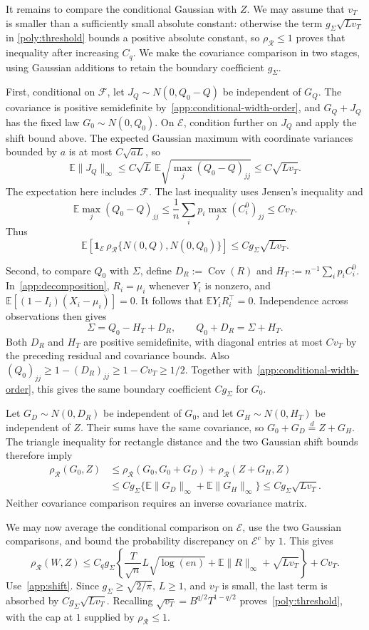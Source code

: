 \documentclass[11pt,letterpaper]{article}
\theoremstyle{remark}
\newcommand{\E}{\mathbb E}
\newcommand{\Cov}{\operatorname{Cov}}
\newcommand{\rh}{\rho_{\mathcal R}}
\newcommand{\ind}{\mathbf 1}
\begin{document}
It remains to compare the conditional Gaussian with $Z$. We may
assume that $v_T$ is smaller than a sufficiently small absolute
constant: otherwise the term $g_\Sigma\sqrt{Lv_T}$ in
\eqref{poly:threshold} bounds a positive absolute constant, so
$\rh\le1$ proves that inequality after increasing $C_q$.
We make the covariance comparison in two stages, using Gaussian
additions to retain the boundary coefficient $g_\Sigma$.

First, conditional on $\mathcal F$, let
$J_Q\sim N(0,Q_0-Q)$ be independent of $G_Q$. The covariance is
positive semidefinite by~\eqref{app:conditional-width-order}, and
$G_Q+J_Q$ has the fixed law $G_0\sim N(0,Q_0)$. On
$\mathcal E$, condition further on $J_Q$ and apply the shift
bound above. The expected Gaussian maximum with coordinate
variances bounded by $a$ is at most $C\sqrt{aL}$, so
\[
 \E\|J_Q\|_\infty
 \le C\sqrt L\,\E\sqrt{\max_j(Q_0-Q)_{jj}}
 \le C\sqrt{Lv_T}.
\]
The expectation here includes $\mathcal F$. The last inequality
uses Jensen's inequality and
\[
 \E\max_j(Q_0-Q)_{jj}
 \le\frac1n\sum_i p_i\max_j(C_i^0)_{jj}\le Cv_T.
\]
Thus
\[
 \E\!\left[\ind_{\mathcal E}\,
     \rh\{N(0,Q),N(0,Q_0)\}\right]
 \le Cg_\Sigma\sqrt{Lv_T}.
\]

Second, to compare $Q_0$ with $\Sigma$, define
$D_R:=\Cov(R)$ and $H_T:=n^{-1}\sum_i p_iC_i^0$.
In~\eqref{app:decomposition}, $R_i=\mu_i$ whenever $Y_i$ is
nonzero, and $\E[(1-I_i)(X_i-\mu_i)]=0$. It follows that
$\E Y_iR_i^\top=0$. Independence across observations then gives
\[
 \Sigma=Q_0-H_T+D_R,\qquad Q_0+D_R=\Sigma+H_T.
\]
Both $D_R$ and $H_T$ are positive semidefinite, with diagonal
entries at most $Cv_T$ by the preceding residual and covariance
bounds. Also $(Q_0)_{jj}\ge1-(D_R)_{jj}\ge1-Cv_T\ge1/2$.
Together with~\eqref{app:conditional-width-order}, this gives
the same boundary coefficient $Cg_\Sigma$ for $G_0$.

Let $G_D\sim N(0,D_R)$ be independent of $G_0$, and let
$G_H\sim N(0,H_T)$ be independent of $Z$. Their sums have the
same covariance, so $G_0+G_D\stackrel d=Z+G_H$. The triangle
inequality for rectangle distance and the two Gaussian shift
bounds therefore imply
\[
 \begin{split}
 \rh(G_0,Z)
 &\le\rh(G_0,G_0+G_D)+\rh(Z+G_H,Z)\\
 &\le Cg_\Sigma\{\E\|G_D\|_\infty+\E\|G_H\|_\infty\}
 \le Cg_\Sigma\sqrt{Lv_T}.
 \end{split}
\]
Neither covariance comparison requires an inverse covariance matrix.

We may now average the conditional comparison on $\mathcal E$,
use the two Gaussian comparisons, and bound the probability
discrepancy on $\mathcal E^c$ by $1$. This gives
\[
 \rh(W,Z)\le C_qg_\Sigma\left\{
 \frac{T}{\sqrt n}L\sqrt{\log(en)}
 +\E\|R\|_\infty+\sqrt{Lv_T}\right\}+Cv_T.
\]
Use~\eqref{app:shift}. Since $g_\Sigma\ge\sqrt{2/\pi}$,
$L\ge1$, and $v_T$ is small, the last term is absorbed by
$Cg_\Sigma\sqrt{Lv_T}$. Recalling
$\sqrt{v_T}=B^{q/2}T^{1-q/2}$ proves~\eqref{poly:threshold},
with the cap at $1$ supplied by $\rh\le1$.
\end{document}
